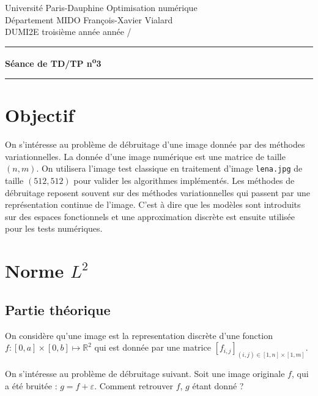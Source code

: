 \documentclass[10pt,a4paper,fleqn]{report}
\makeatletter
\def\cleardoublepage{\clearpage\if@twoside\ifodd\c@page\else\hbox{}\thispagestyle{empty}\newpage\fi\fi}
\newcommand{\R}{\mathbb R}
\makeatother
\begin{document}
\cleardoublepage

\noindent
Universit\'e Paris-Dauphine     \hfill      Optimisation num\'erique\\
D\'epartement MIDO              \hfill      François-Xavier Vialard\\
DUMI2E troisi\`eme ann\'ee      \hfill      ann\'ee /

\medskip

\hrule

\medskip

\begin{center}

\textbf{\huge S\'{e}ance de TD/TP n\textsuperscript{o}3}

\smallskip

\rule{10cm}{0.4pt}

\end{center}


\section*{Objectif}
On s'int\'eresse au probl\`eme de d\'ebruitage d'une image donn\'ee
par des m\'ethodes variationnelles. La donn\'ee d'une image
num\'erique est une matrice de taille $(n,m)$. On utilisera l'image
test classique en traitement d'image \texttt{lena.jpg} de taille
$(512,512)$ pour valider les algorithmes impl\'ement\'es. Les
m\'ethodes de d\'ebruitage reposent souvent sur des m\'ethodes
variationnelles qui passent par une repr\'esentation continue de
l'image. C'est \`a dire que les mod\`eles sont introduits sur des
espaces fonctionnels et une approximation discr\`ete est ensuite
utilis\'ee pour les tests num\'eriques.


\section{Norme $L^{2}$}
\subsection{Partie théorique}
On consid\`ere qu'une image est la representation discr\`ete d'une
fonction $f:[0,a]\times[0,b] \mapsto \R^2$ qui est donn\'ee par une
matrice $[f_{i,j}]_{(i,j)\in [1,n]\times[1,m]}$.

On s'intéresse au problème de débruitage suivant. Soit une image
originale $f$, qui a été bruitée : $g = f + \varepsilon$. Comment
retrouver $f$, $g$ étant donné ?
\end{document}
